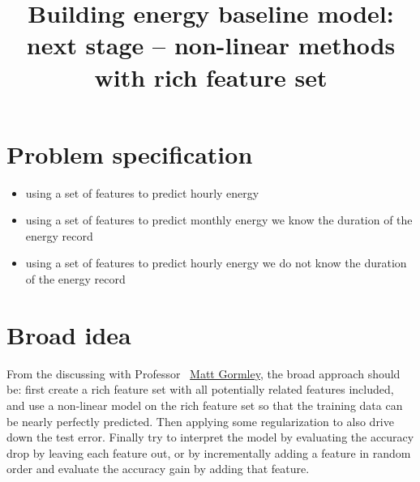 \documentclass[12pt]{article}
\begin{document}
\title{Building energy baseline model: next stage -- non-linear methods with rich feature set}
\maketitle
\tableofcontents
\newpage
\section{Problem specification}
\begin{itemize}
\item using a set of features to predict hourly energy
\item using a set of features to predict monthly energy we know the duration of the energy record
\item using a set of features to predict hourly energy we do not know the duration of the energy record
\end{itemize}
\section{Broad idea}
From the discussing with Professor
~\href{http://www.cs.cmu.edu/~mgormley/}{Matt Gormley}, the broad
approach should be: first create a rich feature set with all
potentially related features included, and use a non-linear model on
the rich feature set so that the training data can be nearly perfectly
predicted. Then applying some regularization to also drive down the
test error. Finally try to interpret the model by evaluating the
accuracy drop by leaving each feature out, or by incrementally adding
a feature in random order and evaluate the accuracy gain by adding
that feature.
\end{document}
